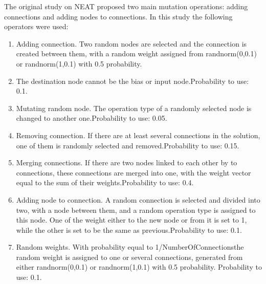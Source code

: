 The original study on NEAT proposed two main mutation operations: adding connections and adding 
nodes to connections.
In this study the following operators were used:
\begin{enumerate}
	\item Adding connection. Two random nodes are selected and the connection is created between
		them, with a random weight assigned from randnorm(0,0.1) or randnorm(1,0.1) with 0.5
		probability.
	\item The destination node cannot be the bias or input node.Probability to use: 0.1.
	\item Mutating random node. The operation type of a randomly selected node is changed 
		to another one.Probability to use: 0.05.
	\item Removing connection. If there are at least several connections in the solution,
		one of them is randomly selected and removed.Probability to use: 0.15.
	\item Merging  connections.  If there  are  two  nodes  linked  to  each  other  by  to 
		connections,  these connections  are  merged  into  one,  with  the  weight  vector 
		equal  to  the  sum  of  their  weights.Probability to use: 0.4.
	\item Adding node to connection. A random connection is selected and divided into two,
		with a node between them, and a random operation type is assigned to this node.
		One of the weight either to the new node or from it is set to 1, while the other is set to 
		be the same as previous.Probability to use: 0.1.
	\item Random  weights.  With  probability  equal  to  1/NumberOfConnectionsthe  random  weight
		is assigned   to   one   or   several   connections,   generated   from   either
		randnorm(0,0.1)   or randnorm(1,0.1) with 0.5 probability. Probability to use: 0.1.
\end{enumerate}
